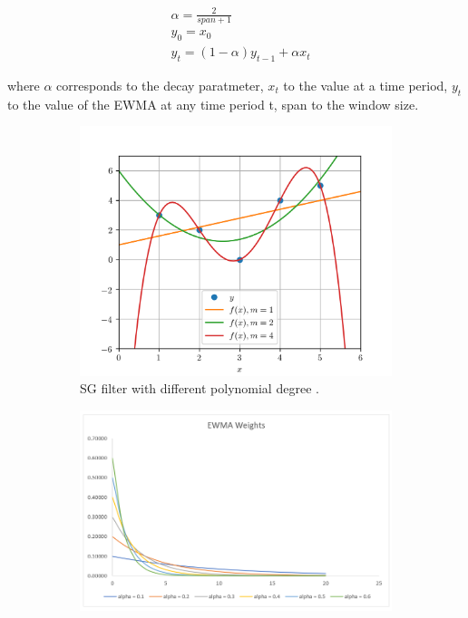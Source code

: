 \begin{equation}\label{ewma-eq}
    \begin{aligned}
        &\alpha=\frac{2}{span+1} \\
        &y_0=x_0 \\
        &y_t=(1-\alpha)y_{t-1}+\alpha x_t
    \end{aligned}
\end{equation}

\noindent
where $\alpha$ corresponds to the decay paratmeter, $x_t$ to the value at a time period, $y_t$ to the value of the EWMA at any time period t, span to the window size.

\begin{figure}[h]
    \centering
    \begin{subfigure}[t]{0.4\textwidth}
      \includegraphics[width=\linewidth]{imgs/pre-processing/demo-polynomial-fitting.png}
      \caption{SG filter with different polynomial degree \citep{taalSmoothingYourData2017}.} \label{fig:filters-sg}
    \end{subfigure}%
    \hspace{2em}%
    \begin{subfigure}[t]{0.5\textwidth}
      \includegraphics[width=\linewidth]{imgs/pre-processing/demo-weight-ewma.png}

\end{subfigure}
\end{figure}
